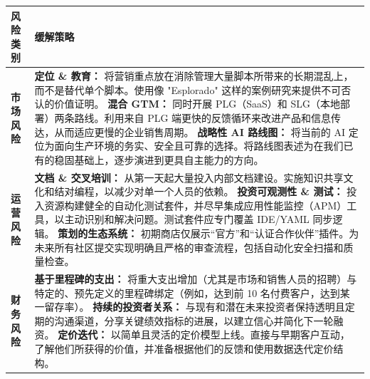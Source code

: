 \documentclass[11pt, a4paper, oneside]{article}
\begin{document}
\begin{table}[H]
\centering
\begin{tabularx}{\textwidth}{@{}lL@{}}
\toprule
\textbf{风险类别} & \textbf{缓解策略} \\
\midrule
\textbf{市场风险} & 
\textbf{定位 \& 教育：} 将营销重点放在消除管理大量脚本所带来的长期混乱上，而不是替代单个脚本。使用像 "Esplorado" 这样的案例研究来提供不可否认的价值证明。 \newline\newline
\textbf{混合 GTM：} 同时开展 PLG（SaaS）和 SLG（本地部署）两条路线。利用来自 PLG 端更快的反馈循环来改进产品和信息传达，从而适应更慢的企业销售周期。 \newline\newline
\textbf{战略性 AI 路线图：} 将当前的 AI 定位为面向生产环境的务实、安全且可靠的选择。将路线图表述为在我们已有的稳固基础上，逐步演进到更具自主能力的方向。 \\
\addlinespace
\textbf{运营风险} & 
\textbf{文档 \& 交叉培训：} 从第一天起大量投入内部文档建设。实施知识共享文化和结对编程，以减少对单一个人员的依赖。 \newline\newline
\textbf{投资可观测性 \& 测试：} 投入资源构建健全的自动化测试套件，并尽早集成应用性能监控（APM）工具，以主动识别和解决问题。测试套件应专门覆盖 IDE/YAML 同步逻辑。 \newline\newline
\textbf{策划的生态系统：} 初期商店仅展示“官方”和“认证合作伙伴”插件。为未来所有社区提交实现明确且严格的审查流程，包括自动化安全扫描和质量检查。 \\
\addlinespace
\textbf{财务风险} & 
\textbf{基于里程碑的支出：} 将重大支出增加（尤其是市场和销售人员的招聘）与特定的、预先定义的里程碑绑定（例如，达到前 10 名付费客户，达到某一留存率）。 \newline\newline
\textbf{持续的投资者关系：} 与现有和潜在未来投资者保持透明且定期的沟通渠道，分享关键绩效指标的进展，以建立信心并简化下一轮融资。 \newline\newline
\textbf{定价迭代：} 以简单且灵活的定价模型上线。直接与早期客户互动，了解他们所获得的价值，并准备根据他们的反馈和使用数据迭代定价结构。 \\
\bottomrule
\end{tabularx}
\end{table}

\end{document}
